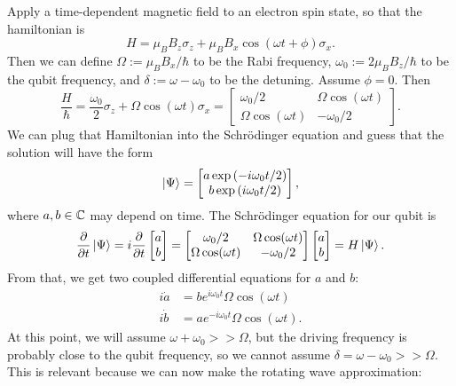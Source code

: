 \documentclass{article}
\begin{document}
\begin{enumerate}[label=(\alph*)]
        
\end{enumerate}

\bigskip
\begin{prob}
\end{prob}
Apply a time-dependent magnetic field to an electron spin state, so that the hamiltonian is
\[ H = \mu_B B_z \sigma_z + \mu_B B_x \cos (\omega t + \phi) \sigma_x. \]
Then we can define $\Omega := \mu_B B_x / \hbar$ to be the Rabi frequency, $\omega_0 := 2 \mu_B B_z / \hbar$ to be the qubit frequency, and $\delta := \omega - \omega_0$ to be the detuning. Assume $\phi=0$. Then
\[ \frac{H}{\hbar} = \frac{\omega_0}{2} \sigma_z + \Omega \cos (\omega t) \sigma_x = \begin{bmatrix}
    \omega_0/2 & \Omega \cos (\omega t) \\
    \Omega \cos (\omega t) & -\omega_0 / 2
\end{bmatrix}. \]
We can plug that Hamiltonian into the Schrödinger equation and guess that the solution will have the form
\[ \left\lvert \Psi \right\rangle = \begin{bmatrix}
    a \exp \left( -i \omega_0 t / 2 \right) \\
    b \exp \left( i \omega_0 t / 2 \right)
\end{bmatrix}, \]
where $a, b \in \mathbb{C}$ may depend on time. The Schrödinger equation for our qubit is
\[  \frac{\partial}{\partial t} \left\lvert \Psi \right\rangle = i \frac{\partial}{\partial t} \begin{bmatrix}
    a \\
    b
\end{bmatrix} = \begin{bmatrix}
    \omega_0/2 & \Omega \cos (\omega t) \\
    \Omega \cos (\omega t) & -\omega_0 / 2
\end{bmatrix} \begin{bmatrix}
    a \\
    b
\end{bmatrix} = H \left\lvert \Psi \right\rangle. \]
From that, we get two coupled differential equations for $a$ and $b$:
\begin{align*}
    i \dot{a} &= b e^{i \omega_0 t} \Omega \cos(\omega t) \\
    i \dot{b} &= a e^{- i \omega_0 t} \Omega \cos(\omega t).
\end{align*}
At this point, we will assume $\omega + \omega_0 >> \Omega$, but the driving frequency is probably close to the qubit frequency, so we cannot assume $\delta = \omega - \omega_0 >> \Omega$. This is relevant because we can now make the rotating wave approximation:
\end{document}
